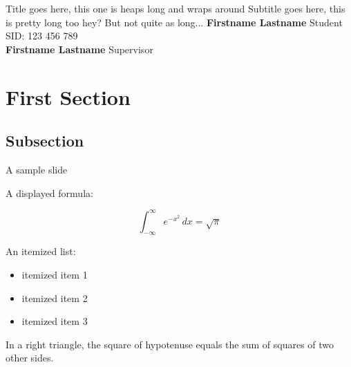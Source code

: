 \documentclass{beamer}
\begin{document}

\usydtitleframe
{Title goes here, this one is heaps long and wraps around}
{
	\vspace{3mm} %
	Subtitle goes here, this is pretty long too hey? But not quite as long...
} {
	\textbf{Firstname Lastname} \hfill Student \\
	SID: 123 456 789 \\
	\vspace{3mm}
	\textbf{Firstname Lastname} \hfill Supervisor \\
}

\section{First Section}
\subsection{Subsection}
\begin{frame}{A sample slide}

A displayed formula:

\[ \int_{-\infty}^\infty e^{-x^2} \, dx = \sqrt{\pi} \]

An itemized list:

\begin{itemize}
  \item itemized item 1
  \item itemized item 2
  \item itemized item 3
\end{itemize}

\begin{theorem}
  In a right triangle, the square of hypotenuse equals
  the sum of squares of two other sides.
\end{theorem}

\end{frame}
\end{document}

